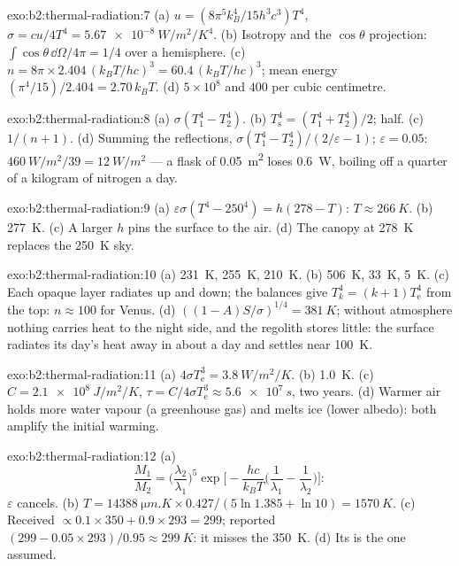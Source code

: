 \begin{solution}{exo:b2:thermal-radiation:7}
(a) $u = (8\pi^5k_B^4/15h^3c^3)T^4$, $\sigma = cu/4T^4 = \qty{5.67e-8}{W/m^2/K^4}$.
(b) Isotropy and the $\cos\theta$ projection: $\int\cos\theta\,\dd\Omega/4\pi = 1/4$
over a hemisphere. (c) $n = 8\pi \times 2.404\,(k_BT/hc)^3 = 60.4\,(k_BT/hc)^3$;
mean energy $(\pi^4/15)/2.404 = 2.70\,k_BT$. (d) $5 \times 10^8$ and $400$
per cubic centimetre.
\end{solution}

\begin{solution}{exo:b2:thermal-radiation:8}
(a) $\sigma(T_1^4 - T_2^4)$. (b) $T_{\text{s}}^4 = (T_1^4 + T_2^4)/2$; half. (c)
$1/(n + 1)$. (d) Summing the reflections, $\sigma(T_1^4 - T_2^4)/(2/\varepsilon -
1)$; $\varepsilon = 0.05$: $\qty{460}{W/m^2}/39 = \qty{12}{W/m^2}$ --- a flask of
\qty{0.05}{m^2} loses \qty{0.6}{W}, boiling off a quarter of a kilogram of
nitrogen a day.
\end{solution}

\begin{solution}{exo:b2:thermal-radiation:9}
(a) $\varepsilon\sigma(T^4 - 250^4) = h(278 - T)$: $T \approx \qty{266}{K}$. (b)
\qty{277}{K}. (c) A larger $h$ pins the surface to the air. (d) The canopy
at \qty{278}{K} replaces the \qty{250}{K} sky.
\end{solution}

\begin{solution}{exo:b2:thermal-radiation:10}
(a) \qty{231}{K}, \qty{255}{K}, \qty{210}{K}. (b) \qty{506}{K}, \qty{33}{K}, \qty{5}{K}.
(c) Each opaque layer radiates up and down; the balances give
$T_k^4 = (k + 1)T_{\text{e}}^4$ from the top: $n \approx 100$ for Venus. (d)
$((1 - A)S/\sigma)^{1/4} = \qty{381}{K}$; without atmosphere nothing carries
heat to the night side, and the regolith stores little: the surface
radiates its day's heat away in about a day and settles near
\qty{100}{K}.
\end{solution}

\begin{solution}{exo:b2:thermal-radiation:11}
(a) $4\sigma T_{\text{e}}^3 = \qty{3.8}{W/m^2/K}$. (b) \qty{1.0}{K}. (c) $C =
\qty{2.1e8}{J/m^2/K}$, $\tau = C/4\sigma T_{\text{e}}^3 \approx \qty{5.6e7}{s}$, two
years. (d) Warmer air holds more water vapour (a greenhouse gas) and
melts ice (lower albedo): both amplify the initial warming.
\end{solution}

\begin{solution}{exo:b2:thermal-radiation:12}
(a)
\[
\frac{M_1}{M_2} = \Big(\frac{\lambda_2}{\lambda_1}\Big)^5\exp\Big[-\frac{hc}{k_BT}\Big(\frac{1}{\lambda_1} - \frac{1}{\lambda_2}\Big)\Big] :
\]
$\varepsilon$ cancels. (b) $T = \qty{14388}{\micro m.K} \times 0.427/(5\ln 1.385 +
\ln 10) = \qty{1570}{K}$. (c) Received $\propto 0.1 \times 350 + 0.9 \times 293 =
299$; reported $(299 - 0.05 \times 293)/0.95 \approx \qty{299}{K}$: it misses the
\qty{350}{K}. (d) Its  is the one assumed.
\end{solution}

